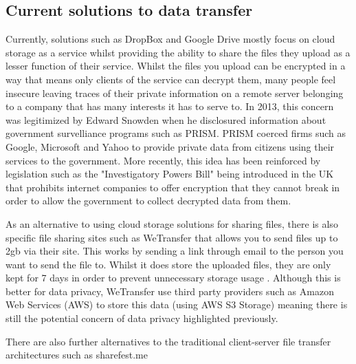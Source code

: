 \documentclass[]{report}
\begin{document}
		\subsection*{Current solutions to data transfer}
			Currently, solutions such as DropBox and Google Drive mostly focus on cloud storage as a service whilst providing the ability to share the files they upload as a lesser function of their service. Whilst the files you upload can be encrypted in a way that means only clients of the service can decrypt them, many people feel insecure leaving traces of their private information on a remote server belonging to a company that has many interests it has to serve to. In 2013, this concern was legitimized by Edward Snowden when he disclosured information about government survelliance programs such as PRISM. PRISM coerced firms such as Google, Microsoft and Yahoo to provide private data from citizens using their services to the government. \cite{PRISM}  More recently, this idea has been reinforced by legislation such as the "Investigatory Powers Bill"  being introduced in the UK that prohibits internet companies to offer encryption that they cannot break in order to allow the government to collect decrypted data from them. 
			
			As an alternative to using cloud storage solutions for sharing files, there is also specific file sharing sites such as WeTransfer that allows you to send files up to 2gb via their site. This works by sending a link through email to the person you want to send the file to. Whilst it does store the uploaded files, they are only kept for 7 days in order to prevent unnecessary storage usage \cite{WeTransfer Storage Time}. Although this is better for data privacy, WeTransfer use third party providers such as Amazon Web Services (AWS) to store this data (using AWS S3 Storage) \cite{WeTransfer AWS Case Study} meaning there is still the potential concern of data privacy highlighted previously.
			
			There are also further alternatives to the traditional client-server file transfer architectures such as sharefest.me
			
\end{document}
